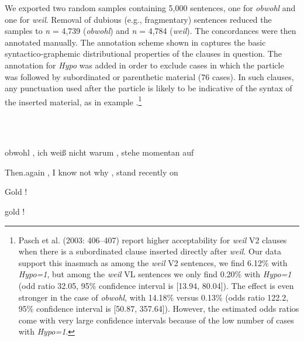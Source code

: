 \begin{styleMoutonTextBeforeExample}
We exported two random samples containing 5,000 sentences, one for \textit{obwohl} and one for \textit{weil}. Removal of dubious (e.g., fragmentary) sentences reduced the samples to \textit{n} = 4,739 (\textit{obwohl}) and \textit{n} = 4,784 (\textit{weil}). The concordances were then annotated manually. The annotation scheme shown in  captures the basic syntactico-graphemic distribu\-tional properties of the clauses in question. The annotation for \textit{Hypo} was added in order to exclude cases in which the particle was followed by subordinated or parenthetic material (76 cases). In such clauses, any punctuation used after the particle is likely to be indicative of the syntax of the inserted material, as in example .\footnote{Pasch et al. (2003: 406–407) report higher acceptability for \textit{weil} V2 clauses when there is a subordinated clause inserted directly after \textit{weil}. Our data support this inasmuch as among the \textit{weil} V2 sentences, we find 6.12\% with \textit{Hypo=1}, but among the \textit{weil} VL sentences we only find 0.20\% with \textit{Hypo=1} (odd ratio 32.05, 95\% confidence interval is [13.94, 80.04]). The effect is even stronger in the case of \textit{obwohl}, with 14.18\% versus 0.13\% (odds ratio 122.2, 95\% confidence interval is [50.87, 357.64]). However, the estimated odds ratios come with very large confidence intervals because of the low number of cases with \textit{Hypo=1}.}
\end{styleMoutonTextBeforeExample}

\begin{styleMoutonExample}
\ea%
    \label{ex:key:10}
    \gll\\
        \\
    \glt
    \z

          obwohl  ,  ich  weiß  nicht  warum  ,  stehe  momentan  auf
\end{styleMoutonExample}

\begin{styleMoutonExampleAlpha}
Then.again  ,  I  know  not  why    ,  stand  recently  on
\end{styleMoutonExampleAlpha}

\begin{styleMoutonExampleAlpha}
Gold  !
\end{styleMoutonExampleAlpha}

\begin{styleMoutonExampleAlpha}
gold  !
\end{styleMoutonExampleAlpha}

